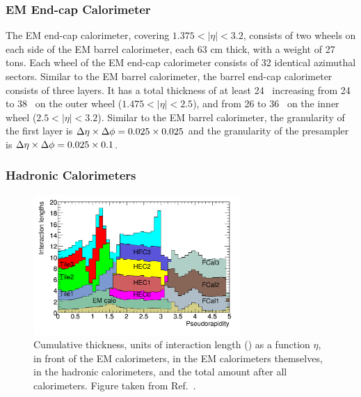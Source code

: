 \subsubsection{EM End-cap Calorimeter}
The EM end-cap calorimeter, covering $1.375<|\eta|<3.2$, consists of two wheels on each side of the EM barrel calorimeter, each 63 cm thick, with a weight of 27 tons. Each wheel of the EM end-cap calorimeter consists of 32 identical azimuthal sectors. Similar to the EM barrel calorimeter, the barrel end-cap calorimeter consists of three layers. It has a total thickness of at least 24 \radlen\, increasing from 24 to 38 \radlen\ on the outer wheel ($1.475<|\eta|<2.5$), and from 26 to 36 \radlen\ on the inner wheel ($2.5<|\eta|<3.2$). Similar to the EM barrel calorimeter, the granularity of the first layer is $\mbox{$\Delta \eta$}\times\mbox{$\Delta \phi$}=0.025\times0.025$ and the granularity of the presampler is $\mbox{$\Delta \eta$}\times\mbox{$\Delta \phi$}=0.025\times0.1$.

\subsubsection{Hadronic Calorimeters}

\begin{figure}
	\centering
	\includegraphics[width=0.7\textwidth]{figures/interaction_lengths.pdf} %
	\caption{Cumulative thickness, units of interaction length (\intlen) as a function $\eta$, in front of the EM calorimeters, in the EM calorimeters themselves, in the hadronic calorimeters, and the total amount after all calorimeters. Figure taken from Ref.~\cite{Aad:2008zzm}.}	
	\label{fig:interactionlengths}
\end{figure}

